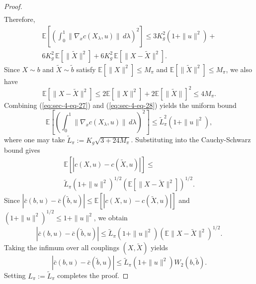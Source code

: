 \documentclass[10pt,a4paper]{amsart}
\begin{document}
\begin{proof}
\begin{multline}
\end{multline}
Therefore,
\begin{multline}
\label{eq:sec-4-eq-27}
\mathbb{E}\!\left[\left(\int_0^1 \|\nabla_x c(X_\lambda,u)\|\,d\lambda\right)^2\right]
\le
3K_g^2\left(1+\|u\|^2\right)
+ \\
6K_g^2\,\mathbb{E}[\|\tilde X\|^2]
+
6K_g^2\,\mathbb{E}[\|X-\tilde X\|^2].
\end{multline}
Since $X\sim b$ and $\tilde X\sim \tilde b$ satisfy $\mathbb{E}[\|X\|^2] \le M_\pi$ and $\mathbb{E}[\|\tilde X\|^2] \le M_\pi$, we also have
\begin{equation}
\label{eq:sec-4-eq-28}
\mathbb{E}[\|X-\tilde X\|^2] \le 2\mathbb{E}[\|X\|^2] + 2\mathbb{E}[\|\tilde X\|]^2 \le 4M_\pi.
\end{equation}
Combining (\ref{eq:sec-4-eq-27}) and (\ref{eq:sec-4-eq-28}) yields the uniform bound
\begin{equation}
\mathbb{E}\!\left[\left(\int_0^1 \|\nabla_x c(X_\lambda,u)\|\,d\lambda\right)^2\right]
\le
\tilde L_\pi^2\left(1+\|u\|^2\right),
\end{equation}
where one may take $\tilde L_\pi:=K_g\sqrt{3+24M_\pi}$.
Substituting into the Cauchy-Schwarz bound gives
\begin{multline}
\mathbb{E}\!\left[|c(X,u)-c(\tilde X,u)|\right]
\le \\
\tilde L_\pi\left(1+\|u\|^2\right)^{1/2}\left(\mathbb{E}[\|X-\tilde X\|^2]\right)^{1/2}.
\end{multline}
Since $\left|\bar c(b,u)-\bar c(\tilde b,u)\right|\le \mathbb{E}\!\left[|c(X,u)-c(\tilde X,u)|\right]$ and $(1+\|u\|^2)^{1/2}\le 1+\|u\|^2$, we obtain
\begin{equation}
\left|\bar c(b,u)-\bar c(\tilde b,u)\right|
\le
\tilde L_\pi\left(1+\|u\|^2\right)\left(\mathbb{E}\|X-\tilde X\|^2\right)^{1/2}.
\end{equation}
Taking the infimum over all couplings $(X,\tilde X)$ yields
\begin{equation}
\left|\bar c(b,u)-\bar c(\tilde b,u)\right|
\le
\tilde L_\pi\left(1+\|u\|^2\right)W_2(b,\tilde b).
\end{equation}
Setting $L_\pi:=\tilde L_\pi$ completes the proof.
\end{proof}
\end{document}
